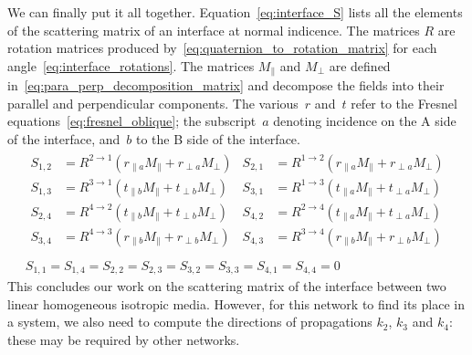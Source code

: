 We can finally put it all together.
Equation~\eqref{eq:interface_S} lists all the elements of the scattering matrix of an interface at normal indicence.
The matrices $R$ are rotation matrices produced by~\eqref{eq:quaternion_to_rotation_matrix} for each angle~\eqref{eq:interface_rotations}.
The matrices $M_\parallel$ and $M_\perp$ are defined in~\eqref{eq:para_perp_decomposition_matrix} and decompose the fields into their parallel and perpendicular components.
The various~$r$ and~$t$ refer to the Fresnel equations~\eqref{eq:fresnel_oblique}; the subscript~$a$ denoting incidence on the A side of the interface, and~$b$ to the B side of the interface.
\begin{equation}
    \begin{gathered}
    \begin{aligned}
        S_{1, 2} &= R^{2 \rightarrow 1} \left(
            r_{\parallel a} M_\parallel +
            r_{\perp a} M_\perp
        \right)
        &
        S_{2, 1} &= R^{1 \rightarrow 2} \left(
            r_{\parallel a} M_\parallel +
            r_{\perp a} M_\perp
        \right)
        \\
        S_{1, 3} &= R^{3 \rightarrow 1} \left(
            t_{\parallel b} M_\parallel +
            t_{\perp b} M_\perp
        \right)
        &
        S_{3, 1} &= R^{1 \rightarrow 3} \left(
            t_{\parallel a} M_\parallel +
            t_{\perp a} M_\perp
        \right)
        \\
        S_{2, 4} &= R^{4 \rightarrow 2} \left(
            t_{\parallel b} M_\parallel +
            t_{\perp b} M_\perp
        \right)
        &
        S_{4, 2} &= R^{2 \rightarrow 4} \left(
            t_{\parallel a} M_\parallel +
            t_{\perp a} M_\perp
        \right)
        \\
        S_{3, 4} &= R^{4 \rightarrow 3} \left(
            r_{\parallel b} M_\parallel +
            r_{\perp b} M_\perp
        \right)
        &
        S_{4, 3} &= R^{3 \rightarrow 4} \left(
            r_{\parallel b} M_\parallel +
            r_{\perp b} M_\perp
        \right)
        \\
    \end{aligned}
    \\
    S_{1, 1} = S_{1, 4} = S_{2, 2} = S_{2, 3} = S_{3, 2} = S_{3, 3} = S_{4, 1} = S_{4, 4} = 0
    \end{gathered}
    \label{eq:interface_S}
\end{equation}
This concludes our work on the scattering matrix of the interface between two linear homogeneous isotropic media.
However, for this network to find its place in a system, we also need to compute the directions of propagations $k_2$, $k_3$ and $k_4$: these may be required by other networks.

